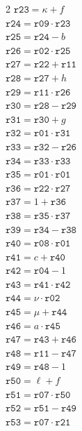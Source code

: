 \documentclass[10pt]{article}
\begin{document}
\begin{multicols}{2}
\(\mathtt{r23} = \kappa + f\)\\
\(\mathtt{r24} = \mathtt{r09} \cdot \mathtt{r23}\)\\
\(\mathtt{r25} = \mathtt{r24} - b\)\\
\(\mathtt{r26} = \mathtt{r02} \cdot \mathtt{r25}\)\\
\(\mathtt{r27} = \mathtt{r22} + \mathtt{r11}\)\\
\(\mathtt{r28} = \mathtt{r27} + h\)\\
\(\mathtt{r29} = \mathtt{r11} \cdot \mathtt{r26}\)\\
\(\mathtt{r30} = \mathtt{r28} - \mathtt{r29}\)\\
\(\mathtt{r31} = \mathtt{r30} + g\)\\
\(\mathtt{r32} = \mathtt{r01} \cdot \mathtt{r31}\)\\
\(\mathtt{r33} = \mathtt{r32} - \mathtt{r26}\)\\
\(\mathtt{r34} = \mathtt{r33} \cdot \mathtt{r33}\)\\
\(\mathtt{r35} = \mathtt{r01} \cdot \mathtt{r01}\)\\
\(\mathtt{r36} = \mathtt{r22} \cdot \mathtt{r27}\)\\
\(\mathtt{r37} = 1 + \mathtt{r36}\)\\
\(\mathtt{r38} = \mathtt{r35} \cdot \mathtt{r37}\)\\
\(\mathtt{r39} = \mathtt{r34} - \mathtt{r38}\)\\
\(\mathtt{r40} = \mathtt{r08} \cdot \mathtt{r01}\)\\
\(\mathtt{r41} = c + \mathtt{r40}\)\\
\(\mathtt{r42} = \mathtt{r04} - 1\)\\
\(\mathtt{r43} = \mathtt{r41} \cdot \mathtt{r42}\)\\
\(\mathtt{r44} = \nu \cdot \mathtt{r02}\)\\
\(\mathtt{r45} = \mu + \mathtt{r44}\)\\
\(\mathtt{r46} = a \cdot \mathtt{r45}\)\\
\columnbreak
\(\mathtt{r47} = \mathtt{r43} + \mathtt{r46}\)\\
\(\mathtt{r48} = \mathtt{r11} - \mathtt{r47}\)\\
\(\mathtt{r49} = \mathtt{r48} - 1\)\\
\(\mathtt{r50} = \ell + f\)\\
\(\mathtt{r51} = \mathtt{r07} \cdot \mathtt{r50}\)\\
\(\mathtt{r52} = \mathtt{r51} - \mathtt{r49}\)\\
\(\mathtt{r53} = \mathtt{r07} \cdot \mathtt{r21}\)\\

\end{multicols}
\end{document}

